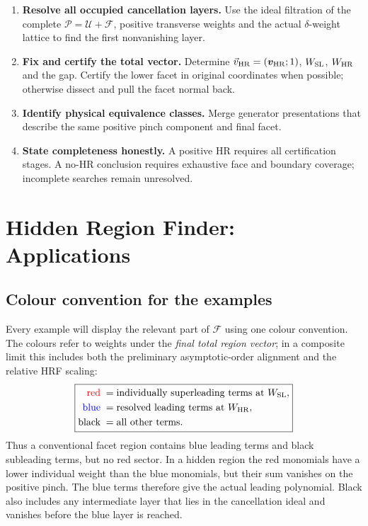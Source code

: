 \documentclass[a4paper,11pt]{article}
\newcommand{\HR}{\mathrm{HR}}
\newcommand{\WSL}{W_{\rm SL}}
\newcommand{\WHR}{W_{\rm HR}}
\newcommand{\vHR}{\vec v_{\rm HR}}
\newcommand{\SLcolour}[1]{{\color{red}#1}}
\newcommand{\HRcolour}[1]{{\color{blue}#1}}
\newcommand{\Othercolour}[1]{{\color{black}#1}}
\begin{document}
\begin{enumerate}[label=\textbf{\arabic*.},leftmargin=*]
\item \textbf{Resolve all occupied cancellation layers.}
      Use the ideal filtration of the complete
      \(\mathcal P=\mathcal U+\mathcal F\), positive transverse weights and
      the actual \(\delta\)-weight lattice to find the first nonvanishing
      layer.
\item \textbf{Fix and certify the total vector.}
      Determine \(\vHR=(\boldsymbol v_{\HR};1)\), \(\WSL\), \(\WHR\) and the
      gap.  Certify the lower facet in original coordinates when possible;
      otherwise dissect and pull the facet normal back.
\item \textbf{Identify physical equivalence classes.}
      Merge generator presentations that describe the same positive pinch
      component and final facet.
\item \textbf{State completeness honestly.}
      A positive HR requires all certification stages.  A no-HR conclusion
      requires exhaustive face and boundary coverage; incomplete searches
      remain unresolved.
\end{enumerate}

\section{Hidden Region Finder: Applications}
\label{sec:applications}

\subsection*{Colour convention for the examples}
\label{sec:example-colours}

Every example will display the relevant part of \(\mathcal F\) using one
colour convention.  The colours refer to weights under the \emph{final total
region vector}; in a composite limit this includes both the preliminary
asymptotic-order alignment and the relative HRF scaling:
\begin{equation}
 \boxed{\begin{aligned}
 \SLcolour{\text{red}}\;&=\text{individually superleading terms at }\WSL,\\
 \HRcolour{\text{blue}}\;&=\text{resolved leading terms at }\WHR,\\
 \Othercolour{\text{black}}\;&=\text{all other terms}.
 \end{aligned}}
\label{eq:colour-key}
\end{equation}
Thus a conventional facet region contains blue leading terms and black
subleading terms, but no red sector.  In a hidden region the red monomials
have a lower individual weight than the blue monomials, but their sum
vanishes on the positive pinch.  The blue terms therefore give the actual
leading polynomial.  Black also includes any intermediate layer that lies
in the cancellation ideal and vanishes before the blue layer is reached.
\end{document}
